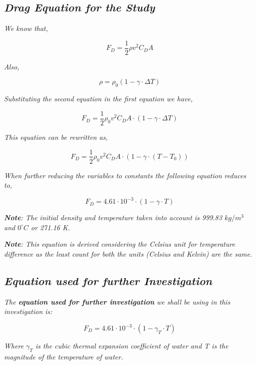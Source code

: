 
\subsection{\textit{Drag Equation for the Study}}
            
   \textit{We know that,}
            
		$$F_D = \frac{1}{2}\rho v^2C_DA$$

	\textit{Also,}
		
		$$\rho = \rho_{0}\left(1 - \gamma\cdot\Delta T\right)$$

	\textit{Substituting the second equation in the first equation we have,}
	
		$$F_D = \frac{1}{2}\rho_{0}v^2C_DA\cdot\left(1 - \gamma\cdot\Delta T\right)$$

	\textit{This equation can be rewritten as,}

		$$F_D = \frac{1}{2}\rho_{0}v^2C_DA\cdot\left(1 - \gamma\cdot\left(T - T_{0}\right)\right)$$

	\textit{When further reducing the variables to constants the following equation reduces to,}

		$$F_D = 4.61\cdot 10^{-3}\cdot\left(1 - \gamma\cdot T\right)$$

	\textit{\textbf{Note}: The initial density and temperature taken into account is 999.83 $kg/m^3$ and ${0}^\circ C$ or 271.16 K.}

	\textit{\textbf{Note}: This equation is derived considering the Celsius unit for temperature difference as the least count for both the units (Celsius and Kelvin) are the same.}

\subsection{\textit{Equation used for further Investigation}}

	\textit{The \textbf{equation used for further investigation} we shall be using in this investigation is:}
            
   	\begin{equation}
      	F_D = 4.61\cdot 10^{-3}\cdot\left(1 - \gamma_{T}\cdot T\right)
      	\label{eq1}
    	\end{equation}
            
	\textit{Where $\gamma_{T}$ is the cubic thermal expansion coefficient of water and T is the magnitude of the temperature of water.}
            
            
            




